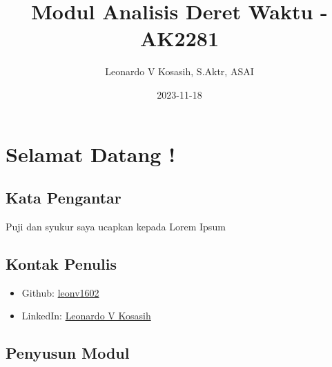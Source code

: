 \documentclass[
]{book}
\title{Modul Analisis Deret Waktu - AK2281}
\author{Leonardo V Kosasih, S.Aktr, ASAI}
\date{2023-11-18}
\providecommand{\tightlist}{%
  \setlength{\itemsep}{0pt}\setlength{\parskip}{0pt}}
\begin{document}
\maketitle

{
\setcounter{tocdepth}{1}
\tableofcontents
}

\hypertarget{selamat-datang}{%
\chapter*{Selamat Datang !}\label{selamat-datang}}

\hypertarget{kata-pengantar}{%
\section*{Kata Pengantar}\label{kata-pengantar}}

Puji dan syukur saya ucapkan kepada Lorem Ipsum

\hypertarget{kontak-penulis}{%
\section*{Kontak Penulis}\label{kontak-penulis}}

\begin{itemize}
\tightlist
\item
  Github: \href{https://github.com/leonv1602}{leonv1602}\\
\item
  LinkedIn: \href{https://www.linkedin.com/in/leonardo-valentino-kosasih-4203a1182/}{Leonardo V Kosasih}
\end{itemize}

\hypertarget{penyusun-modul}{%
\section*{Penyusun Modul}\label{penyusun-modul}}
\end{document}
